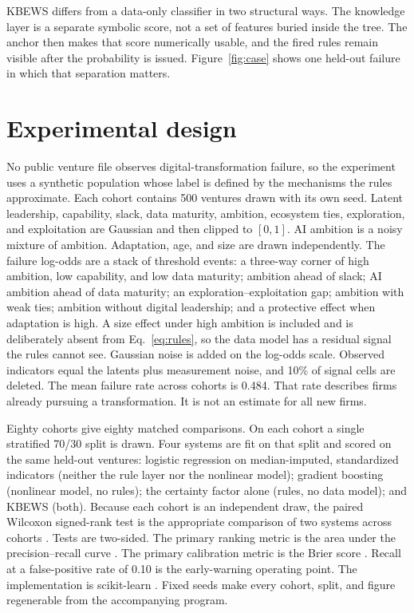 \documentclass[preprint,12pt]{elsarticle}
\begin{document}
\noindent KBEWS differs from a data-only classifier in two structural ways. The knowledge layer is a separate symbolic score, not a set of features buried inside the tree. The anchor then makes that score numerically usable, and the fired rules remain visible after the probability is issued. Figure~\ref{fig:case} shows one held-out failure in which that separation matters.

\section{Experimental design}
\label{sec:protocol}
No public venture file observes digital-transformation failure, so the experiment uses a synthetic population whose label is defined by the mechanisms the rules approximate. Each cohort contains 500 ventures drawn with its own seed. Latent leadership, capability, slack, data maturity, ambition, ecosystem ties, exploration, and exploitation are Gaussian and then clipped to $[0,1]$. AI ambition is a noisy mixture of ambition. Adaptation, age, and size are drawn independently. The failure log-odds are a stack of threshold events: a three-way corner of high ambition, low capability, and low data maturity; ambition ahead of slack; AI ambition ahead of data maturity; an exploration--exploitation gap; ambition with weak ties; ambition without digital leadership; and a protective effect when adaptation is high. A size effect under high ambition is included and is deliberately absent from Eq.~\eqref{eq:rules}, so the data model has a residual signal the rules cannot see. Gaussian noise is added on the log-odds scale. Observed indicators equal the latents plus measurement noise, and 10\% of signal cells are deleted. The mean failure rate across cohorts is 0.484. That rate describes firms already pursuing a transformation. It is not an estimate for all new firms.

Eighty cohorts give eighty matched comparisons. On each cohort a single stratified 70/30 split is drawn. Four systems are fit on that split and scored on the same held-out ventures: logistic regression on median-imputed, standardized indicators (neither the rule layer nor the nonlinear model); gradient boosting (nonlinear model, no rules); the certainty factor alone (rules, no data model); and KBEWS (both). Because each cohort is an independent draw, the paired Wilcoxon signed-rank test is the appropriate comparison of two systems across cohorts \cite{demsar2006}. Tests are two-sided. The primary ranking metric is the area under the precision--recall curve \cite{saito2015}. The primary calibration metric is the Brier score \cite{brier1950}. Recall at a false-positive rate of 0.10 is the early-warning operating point. The implementation is scikit-learn \cite{pedregosa2011}. Fixed seeds make every cohort, split, and figure regenerable from the accompanying program.
\end{document}
